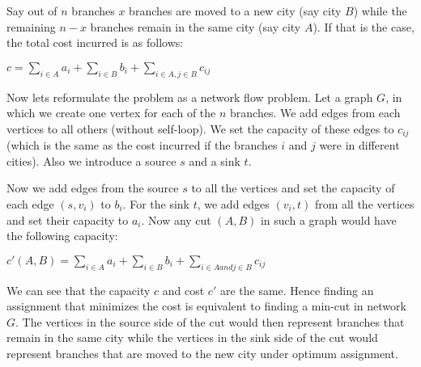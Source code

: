 Say out of $n$ branches $x$ branches are moved to a new city (say city $B$) while the remaining $n-x$ branches remain in the same city (say city $A$). If that is the case, the total cost incurred is as follows:

\begin{center}
$c = \sum\limits_{i \in A} a_i + \sum\limits_{i \in B} b_i + \sum\limits_{i \in A, j \in B} c_{ij} $
\end{center}


Now lets reformulate the problem as a network flow problem. Let a graph $G$, in which we create one vertex for each of the  $n$ branches. We add edges from each vertices to all others (without self-loop). We set the capacity of these edges to $c_{ij}$ (which is the same as the cost incurred if the branches $i$ and $j$ were in different cities). Also we introduce a source $s$ and a sink $t$.

Now we add edges from the source $s$ to all the vertices and set the capacity of each edge $(s, v_i)$ to $b_i$. For the sink $t$, we add edges $(v_i, t)$ from all the vertices and set their capacity to $a_i$. Now any cut $(A, B)$ in such a graph would have the following capacity:

\begin{center}
$c'(A, B) = \sum\limits_{i \in A} a_i + \sum\limits_{i \in B} b_i + \sum\limits_{i \in A and j \in B} c_{ij} $
\end{center}

We can see that the capacity $c$ and cost $c'$ are the same. Hence finding an assignment that minimizes the cost is equivalent to finding a min-cut in network $G$. The vertices in the source side of the cut would then represent branches that remain in the same city while the vertices in the sink side of the cut would represent branches that are moved to the new city under optimum assignment.
